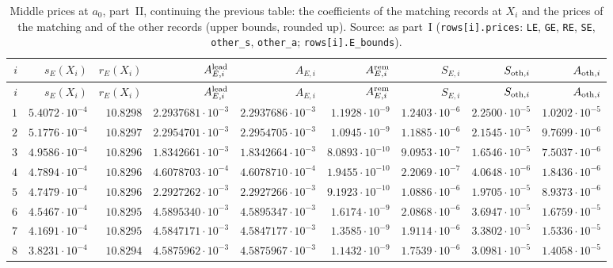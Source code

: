 {\scriptsize\setlength{\tabcolsep}{3.4pt}\renewcommand{\arraystretch}{0.92}
\begin{longtable}{@{}rrrrrrrrr@{}}
\caption{Middle prices at $a_0$, part~II, continuing the previous table: the coefficients of the matching records at $X_i$ and the prices of the matching and of the other records (upper bounds, rounded up). Source: as part~I (\texttt{rows[i].prices}: \texttt{LE}, \texttt{GE}, \texttt{RE}, \texttt{SE}, \texttt{other\_s}, \texttt{other\_a}; \texttt{rows[i].E\_bounds}).}\\
\toprule
$i$ & $s_E(X_i)$ & $r_E(X_i)$ & $A^{\rm lead}_{E,i}$ & $A_{E,i}$ & $A^{\rm rem}_{E,i}$ & $S_{E,i}$ & $S_{{\rm oth},i}$ & $A_{{\rm oth},i}$\\
\midrule
\endfirsthead
\toprule
$i$ & $s_E(X_i)$ & $r_E(X_i)$ & $A^{\rm lead}_{E,i}$ & $A_{E,i}$ & $A^{\rm rem}_{E,i}$ & $S_{E,i}$ & $S_{{\rm oth},i}$ & $A_{{\rm oth},i}$\\
\midrule
\endhead
\bottomrule
\endfoot
$1$ & $5.4072\cdot10^{-4}$ & $10.8298$ & $2.2937681\cdot10^{-3}$ & $2.2937686\cdot10^{-3}$ & $1.1928\cdot10^{-9}$ & $1.2403\cdot10^{-6}$ & $2.2500\cdot10^{-5}$ & $1.0202\cdot10^{-5}$\\
$2$ & $5.1776\cdot10^{-4}$ & $10.8297$ & $2.2954701\cdot10^{-3}$ & $2.2954705\cdot10^{-3}$ & $1.0945\cdot10^{-9}$ & $1.1885\cdot10^{-6}$ & $2.1545\cdot10^{-5}$ & $9.7699\cdot10^{-6}$\\
$3$ & $4.9586\cdot10^{-4}$ & $10.8296$ & $1.8342661\cdot10^{-3}$ & $1.8342664\cdot10^{-3}$ & $8.0893\cdot10^{-10}$ & $9.0953\cdot10^{-7}$ & $1.6546\cdot10^{-5}$ & $7.5037\cdot10^{-6}$\\
$4$ & $4.7894\cdot10^{-4}$ & $10.8296$ & $4.6078703\cdot10^{-4}$ & $4.6078710\cdot10^{-4}$ & $1.9455\cdot10^{-10}$ & $2.2069\cdot10^{-7}$ & $4.0648\cdot10^{-6}$ & $1.8436\cdot10^{-6}$\\
$5$ & $4.7479\cdot10^{-4}$ & $10.8296$ & $2.2927262\cdot10^{-3}$ & $2.2927266\cdot10^{-3}$ & $9.1923\cdot10^{-10}$ & $1.0886\cdot10^{-6}$ & $1.9705\cdot10^{-5}$ & $8.9373\cdot10^{-6}$\\
$6$ & $4.5467\cdot10^{-4}$ & $10.8295$ & $4.5895340\cdot10^{-3}$ & $4.5895347\cdot10^{-3}$ & $1.6174\cdot10^{-9}$ & $2.0868\cdot10^{-6}$ & $3.6947\cdot10^{-5}$ & $1.6759\cdot10^{-5}$\\
$7$ & $4.1691\cdot10^{-4}$ & $10.8295$ & $4.5847171\cdot10^{-3}$ & $4.5847177\cdot10^{-3}$ & $1.3585\cdot10^{-9}$ & $1.9114\cdot10^{-6}$ & $3.3802\cdot10^{-5}$ & $1.5336\cdot10^{-5}$\\
$8$ & $3.8231\cdot10^{-4}$ & $10.8294$ & $4.5875962\cdot10^{-3}$ & $4.5875967\cdot10^{-3}$ & $1.1432\cdot10^{-9}$ & $1.7539\cdot10^{-6}$ & $3.0981\cdot10^{-5}$ & $1.4058\cdot10^{-5}$\\

\end{longtable}}
